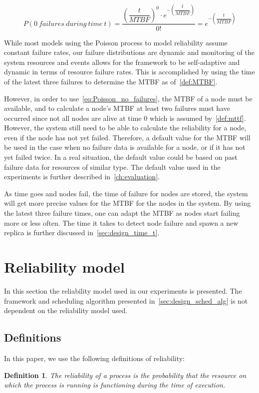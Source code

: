 \documentclass{cslthse-msc}
\newtheorem{definition}{Definition}[chapter]
\begin{document}
\begin{equation} \label{eq:Poisson_no_failures}
P(0\ failures\ during\ time\ t) = \dfrac{\left(\dfrac{t}{MTBF}\right)^0 \cdot e^{-\left(\dfrac{t}{MTBF}\right)}}{0!} = e^{-\left(\dfrac{t}{MTBF}\right)}
\end{equation}

While most models using the Poisson process to model reliability assume constant failure rates, our failure distributions are dynamic and monitoring of the system resources and events allows for the framework to be self-adaptive and dynamic in terms of resource failure rates. This is accomplished by using the time of the latest three failures to determine the MTBF as of~\cref{def:MTBF}. 

However, in order to use~\cref{eq:Poisson_no_failures}, the MTBF of a node must be available, and to calculate a node's MTBF at least two failures must have occurred since not all nodes are alive at time 0 which is assumed by~\cref{def:mttf}. However, the system still need to be able to calculate the reliability for a node, even if the node has not yet failed. Therefore, a default value for the MTBF will be used in the case when no failure data is available for a node, or if it has not yet failed twice. In a real situation, the default value could be based on past failure data for resources of similar type. The default value used in the experiments is further described in~\cref{ch:evaluation}.

As time goes and nodes fail, the time of failure for nodes are stored, the system will get more precise values for the MTBF for the nodes in the system. By using the latest three failure times, one can adapt the MTBF as nodes start failing more or less often. The time it takes to detect node failure and spawn a new replica is further discussed in~\cref{sec:design_time_t}.

\section{Reliability model} \label{sec:design_reliability_model}
In this section the reliability model used in our experiments is presented. The framework and scheduling algorithm presented in~\cref{sec:design_sched_alg} is not dependent on the reliability model used.

\subsection{Definitions} \label{subsec:design_definitions}
In this paper, we use the following definitions of reliability:
\begin{definition} \label{def:single_task_reliability}
The reliability of a process is the probability that the resource on which the process is running is functioning during the time of execution.
\end{definition}
\end{document}
